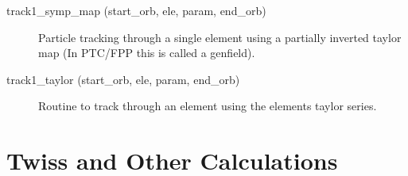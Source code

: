 \begin{description}
\label{r:track1.symp.map}
\item[track1_symp_map (start_orb, ele, param, end_orb)] \Newline
Particle tracking through a single element using a partially inverted 
taylor map (In PTC/FPP this is called a genfield). 

\label{r:track1.taylor}
\item[track1_taylor (start_orb, ele, param, end_orb)] \Newline
Routine to track through an element using the elements taylor series. 

\end{description}

\section{Twiss and Other Calculations}
\label{r:twiss}

